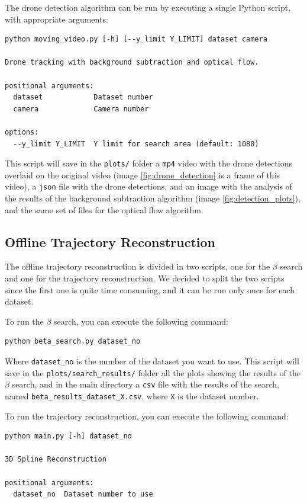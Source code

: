\documentclass[11pt]{article}
\begin{document}
The drone detection algorithm can be run by executing a single Python script, with appropriate arguments:

\begin{verbatim}
python moving_video.py [-h] [--y_limit Y_LIMIT] dataset camera

Drone tracking with background subtraction and optical flow.

positional arguments:
  dataset            Dataset number
  camera             Camera number

options:
  --y_limit Y_LIMIT  Y limit for search area (default: 1080)
\end{verbatim}

This script will save in the \texttt{plots/} folder a \texttt{mp4} video with the drone detections overlaid on the original video (image \ref{fig:drone_detection} is a frame of this video), a \texttt{json} file with the drone detections, and an image with the analysis of the results of the background subtraction algorithm (image \ref{fig:detection_plots}), and the same set of files for the optical flow algorithm.

\subsection{Offline Trajectory Reconstruction}

The offline trajectory reconstruction is divided in two scripts, one for the $\beta$ search and one for the trajectory reconstruction. We decided to split the two scripts since the first one is quite time consuming, and it can be run only once for each dataset.

To run the $\beta$ search, you can execute the following command:

\begin{verbatim}
python beta_search.py dataset_no
\end{verbatim}

Where \texttt{dataset\_no} is the number of the dataset you want to use. This script will save in the \texttt{plots/search\_results/} folder all the plots showing the results of the $\beta$ search, and in the main directory a \texttt{csv} file with the results of the search, named \texttt{beta\_results\_dataset\_X.csv}, where \texttt{X} is the dataset number.

To run the trajectory reconstruction, you can execute the following command:

\begin{verbatim}
python main.py [-h] dataset_no

3D Spline Reconstruction

positional arguments:
  dataset_no  Dataset number to use
\end{verbatim}
\end{document}
